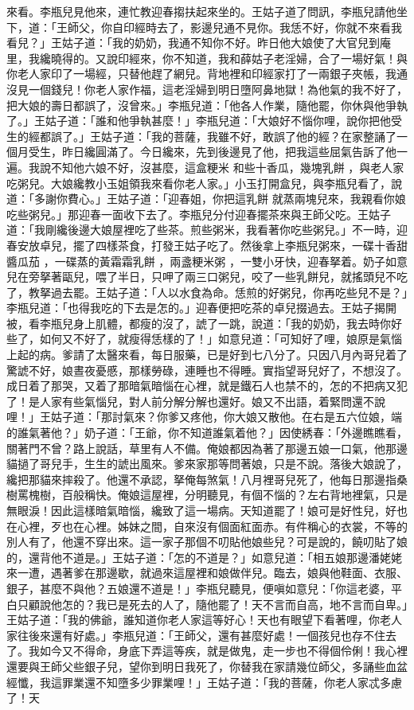 \begin{showcontents}{}
來看。李瓶兒見他來，連忙教迎春搊扶起來坐的。王姑子道了問訊，李瓶兒請他坐下，道：「王師父，你自印經時去了，影邊兒通不見你。我恁不好，你就不來看我看兒？」王姑子道：「我的奶奶，我通不知你不好。昨日他大娘使了大官兒到庵里，我纔曉得的。又說印經來，你不知道，我和薛姑子老淫婦，合了一場好氣！與你老人家印了一場經，只替他趕了網兒。背地裡和印經家打了一兩銀子夾帳，我通沒見一個錢兒！你老人家作福，這老淫婦到明日墮阿鼻地獄！為他氣的我不好了，把大娘的壽日都誤了，沒曾來。」李瓶兒道：「他各人作業，隨他罷，你休與他爭執了。」王姑子道：「誰和他爭執甚麼！」李瓶兒道：「大娘好不惱你哩，說你把他受生的經都誤了。」王姑子道：「我的菩薩，我雖不好，敢誤了他的經？在家整誦了一個月受生，昨日纔圓滿了。今日纔來，先到後邊見了他，把我這些屈氣告訴了他一遍。我說不知他六娘不好，沒甚麼，這盒粳米 和些十香瓜，幾塊乳餅 ，與老人家吃粥兒。大娘纔教小玉姐領我來看你老人家。」小玉打開盒兒，與李瓶兒看了，說道：「多謝你費心。」王姑子道：「迎春姐，你把這乳餅 就蒸兩塊兒來，我親看你娘吃些粥兒。」那迎春一面收下去了。李瓶兒分付迎春擺茶來與王師父吃。王姑子道：「我剛纔後邊大娘屋裡吃了些茶。煎些粥米，我看著你吃些粥兒。」不一時，迎春安放卓兒，擺了四樣茶食，打發王姑子吃了。然後拿上李瓶兒粥來，一碟十香甜醬瓜茄 ，一碟蒸的黃霜霜乳餅 ，兩盞粳米粥 ，一雙小牙快，迎春拏着。奶子如意兒在旁拏著甌兒，喂了半日，只呷了兩三口粥兒，咬了一些乳餅兒，就搖頭兒不吃了，教拏過去罷。王姑子道：「人以水食為命。恁煎的好粥兒，你再吃些兒不是？」李瓶兒道：「也得我吃的下去是怎的。」迎春便把吃茶的卓兒掇過去。王姑子揭開被，看李瓶兒身上肌體，都瘦的沒了，諕了一跳，說道：「我的奶奶，我去時你好些了，如何又不好了，就瘦得恁樣的了！」如意兒道：「可知好了哩，娘原是氣惱上起的病。爹請了太醫來看，每日服藥，已是好到七八分了。只因八月內哥兒着了驚諕不好，娘晝夜憂慼，那樣勞碌，連睡也不得睡。實指望哥兒好了，不想沒了。成日着了那哭，又着了那暗氣暗惱在心裡，就是鐵石人也禁不的，怎的不把病又犯了！是人家有些氣惱兒，對人前分解分解也還好。娘又不出語，着緊問還不說哩！」王姑子道：「那討氣來？你爹又疼他，你大娘又散他。在右是五六位娘，端的誰氣著他？」奶子道：「王爺，你不知道誰氣着他？」因使綉春：「外邊瞧瞧看，關著門不曾？路上說話，草里有人不備。俺娘都因為著了那邊五娘一口氣，他那邊貓撾了哥兒手，生生的諕出風來。爹來家那等問著娘，只是不說。落後大娘說了，纔把那貓來摔殺了。他還不承認，拏俺每煞氣！八月裡哥兒死了，他每日那邊指桑樹罵槐樹，百般稱快。俺娘這屋裡，分明聽見，有個不惱的？左右背地裡氣，只是無眼淚！因此這樣暗氣暗惱，纔致了這一場病。天知道罷了！娘可是好性兒，好也在心裡，歹也在心裡。姊妹之間，自來沒有個面紅面赤。有件稱心的衣裳，不等的別人有了，他還不穿出來。這一家子那個不叨貼他娘些兒？可是說的，饒叨貼了娘的，還背他不道是。」王姑子道：「怎的不道是？」如意兒道：「相五娘那邊潘姥姥來一遭，遇著爹在那邊歇，就過來這屋裡和娘做伴兒。臨去，娘與他鞋面、衣服、銀子，甚麼不與他？五娘還不道是！」李瓶兒聽見，便嗔如意兒：「你這老婆，平白只顧說他怎的？我已是死去的人了，隨他罷了！天不言而自高，地不言而自卑。」王姑子道：「我的佛爺，誰知道你老人家這等好心！天也有眼望下看著哩，你老人家往後來還有好處。」李瓶兒道：「王師父，還有甚麼好處！一個孩兒也存不住去了。我如今又不得命，身底下弄這等疾，就是做鬼，走一步也不得個伶俐！我心裡還要與王師父些銀子兒，望你到明日我死了，你替我在家請幾位師父，多誦些血盆經懺，我這罪業還不知墮多少罪業哩！」王姑子道：「我的菩薩，你老人家忒多慮了！天
\end{showcontents}
